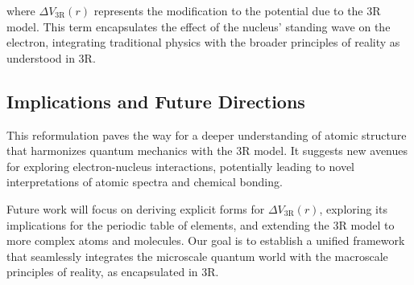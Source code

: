 \documentclass[12pt]{article}
\begin{document}
where $\Delta V_{\text{3R}}(r)$ represents the modification to the potential due to the 3R model. This term encapsulates the effect of the nucleus' standing wave on the electron, integrating traditional physics with the broader principles of reality as understood in 3R.

\subsection{Implications and Future Directions}

This reformulation paves the way for a deeper understanding of atomic structure that harmonizes quantum mechanics with the 3R model. It suggests new avenues for exploring electron-nucleus interactions, potentially leading to novel interpretations of atomic spectra and chemical bonding.

Future work will focus on deriving explicit forms for $\Delta V_{\text{3R}}(r)$, exploring its implications for the periodic table of elements, and extending the 3R model to more complex atoms and molecules. Our goal is to establish a unified framework that seamlessly integrates the microscale quantum world with the macroscale principles of reality, as encapsulated in 3R.
\end{document}
